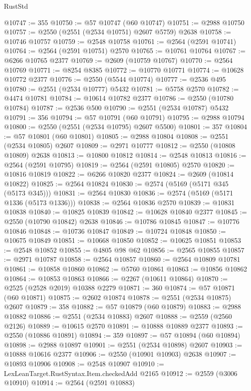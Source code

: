 \begin{lexlean}{RustStd}
\begin{coremodule}
@10747 := 355
@10750 := @57 @10747 (@60 @10747)
@10751 := @2988 @10750
@10757 := @2550 (@2551 (@2534 @10751) @2607 @5759) @2638
@10758 := @10746 @10757
@10759 := @2548 @10758
@10761 := @2564 (@2591 @10741)
@10764 := @2564 (@2591 @10751) @2570
@10765 := @10761 @10764
@10767 := @6266 @10765 @2377
@10769 := @2609 (@10759 @10767)
@10770 := @2564 @10769
@10771 := @8254 @8385
@10772 := @10770 @10771
@10774 := @10628 @10772 @2377
@10776 := @2550 (@5544 @10774)
@10777 := @2536 @495
@10780 := @2551 (@2534 @10777) @5432
@10781 := @5758 @2570
@10782 := @4474 @10781
@10784 := @10614 @10782 @2377
@10786 := @2550 (@10780 @10784)
@10787 := @2536 @500
@10790 := @2551 (@2534 @10787) @5432
@10791 := 356
@10794 := @57 @10791 (@60 @10791)
@10795 := @2988 @10794
@10800 := @2550 (@2551 (@2534 @10795) @2607 @5500)
@10801 := 357
@10804 := @57 @10801 (@60 @10801)
@10805 := @2988 @10804
@10808 := @2551 (@2534 @10805) @2607
@10809 := @2971 @10777
@10812 := @2550 (@10808 @10809) @2638
@10813 := @10800 @10812
@10814 := @2548 @10813
@10816 := @2564 (@2591 @10795)
@10819 := @2564 (@2591 @10805) @2570
@10820 := @10816 @10819
@10822 := @6266 @10820 @2377
@10824 := @2609 (@10814 @10822)
@10825 := @2564 @10824
@10830 := @2574 (@5169 (@5171 @345 (@5173 @345)))
@10831 := @2564 @10830
@10836 := @2574 (@5169 (@5171 @1336 (@5173 @1336)))
@10838 := @2564 @10836 @2570
@10839 := @10831 @10838
@10840 := @10825 @10839
@10842 := @10628 @10840 @2377
@10845 := @2550 (@10790 @10842) @2638
@10846 := @10786 @10845
@10847 := @10776 @10846
@10848 := @10736 @10847
@10849 := @10724 @10848
@10850 := @10675 @10849
@10851 := @10668 @10850
@10852 := @10625 @10851
@10853 := @2548 @10852
@10855 := @4805 @98 @62
@10856 := @2565 @10855
@10857 := @2971 @10787
@10858 := @2564 @10857
@10860 := @2564 @10809 @10781
@10861 := @10858 @10860
@10862 := @5760 @10861
@10863 := @10856 @10862
@10864 := @10853 @10863
@10866 := @2267 (@10611 @10864)
@10870 := @2525 (@2528 @2019) @10388 @2279
@10871 := 360
@10874 := @57 @10871 (@60 @10871)
@10875 := @2602 @10874
@10878 := @2551 (@2534 @10875) @2607
@10879 := 358
@10882 := @57 @10879 (@60 @10879)
@10883 := @2988 @10882
@10886 := @2551 (@2534 @10883) @2607
@10888 := @2559 (@2560 @2126)
@10889 := @10615 @2570
@10891 := @10888 @10889 @2377
@10893 := @2550 (@10886 @10891)
@10894 := 359
@10897 := @57 @10894 (@60 @10894)
@10898 := @2988 @10897
@10901 := @2551 (@2534 @10898) @2607
@10903 := @10888 @10616 @2377
@10906 := @2550 (@10901 @10903) @2638
@10907 := @10893 @10906
@10908 := @2548 @10907
@10910 := LexLeanTarget.RustSyntax.Item.checkedAdd @2165
@10912 := @2559 (@3006 @10910)
@10914 := @2564 (@2591 @10883)

\end{coremodule}
\end{lexlean}
